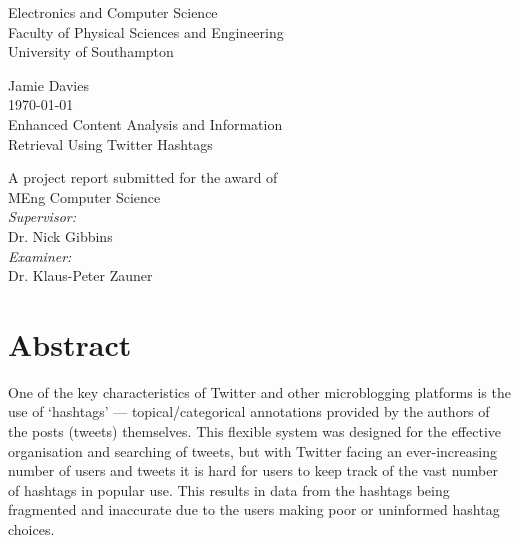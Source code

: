 \documentclass[12pt,a4paper]{article}
\begin{document}
\begin{titlepage}
\center
\vspace*{3cm}

{\Large
    Electronics and Computer Science\\
    Faculty of Physical Sciences and Engineering\\
    University of Southampton\\[1cm]
}

Jamie Davies\\
\today\\[1cm]

{\large
    Enhanced Content Analysis and Information\\
    Retrieval Using Twitter Hashtags\\[1cm]
}

A project report submitted for the award of\\
MEng Computer Science\\[1cm]

\emph{Supervisor:}\\
Dr. Nick Gibbins\\[0.5cm]

\emph{Examiner:}\\
Dr. Klaus-Peter Zauner\\


\vfill
\end{titlepage}

\section*{Abstract}
One of the key characteristics of Twitter and other microblogging platforms is the use of `hashtags' --- topical/categorical annotations provided by the authors of the posts (tweets) themselves. This flexible system was designed for the effective organisation and searching of tweets, but with Twitter facing an ever-increasing number of users and tweets it is hard for users to keep track of the vast number of hashtags in popular use. This results in data from the hashtags being fragmented and inaccurate due to the users making poor or uninformed hashtag choices.
\end{document}

